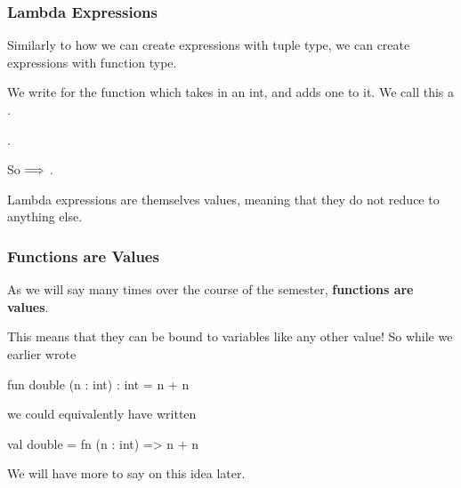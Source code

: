 \documentclass[aspectratio=169, handout]{beamer}
\begin{document}
\begin{frame}[fragile]
  \frametitle{Lambda Expressions}

  Similarly to how we can create expressions with tuple type, we can create expressions
  with function type.

  \pause
  \vspace{\fill}

  We write  for the function which takes in an int, and adds one to it.
  We call this a .

  \pause
  \vspace{5pt}

  .

  \pause
  \vspace{\fill}

  So  $\Longrightarrow$ .

  \pause
  \vspace{\fill}

  Lambda expressions are themselves values, meaning that they do not reduce to anything else.

  \pause
  \vspace{\fill}

\end{frame}

\begin{frame}[fragile]
  \frametitle{Functions are Values}

  As we will say many times over the course of the semester, \textbf{functions are values}.

  \pause
  \vspace{\fill}

  This means that they can be bound to variables like any other value! So while we earlier
  wrote
  \begin{codeblock}
    fun double (n : int) : int = n + n
  \end{codeblock}

  \pause
  \vspace{\fill}

  we could equivalently have written
  \begin{codeblock}
    val double = fn (n : int) => n + n
  \end{codeblock}

  \vspace{\fill}

  We will have more to say on this idea later.
\end{frame}
\end{document}
